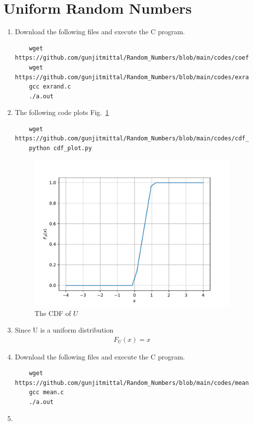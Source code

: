 \documentclass[journal,12pt,twocolumn]{IEEEtran}
\renewcommand\thesection{\arabic{section}}
\begin{document}
\section{Uniform Random Numbers}
\begin{enumerate}[label=\thesection.\arabic*
,ref=\thesection.\theenumi]
    \item \solution{} Download the following files and execute the  C program.
    \begin{lstlisting}
    wget https://github.com/gunjitmittal/Random_Numbers/blob/main/codes/coeffs.h
    wget https://github.com/gunjitmittal/Random_Numbers/blob/main/codes/exrand.c
    gcc exrand.c
    ./a.out
    \end{lstlisting}
    \item \solution{} The following code plots Fig.~\ref{fig:uni_cdf}
    \begin{lstlisting}
    wget https://github.com/gunjitmittal/Random_Numbers/blob/main/codes/cdf_plot.py
    python cdf_plot.py
    \end{lstlisting}
     \begin{figure}[h]
        \centering
        \includegraphics[width=\columnwidth]{../figs/uni_cdf}
        \caption{The CDF of $U$}\label{fig:uni_cdf}
        \end{figure}
    \item \solution{} Since U is  a uniform distribution
    \begin{align}
        F_U(x) = x
    \end{align}
    \item \solution{} Download the following files and execute the  C program.
    \begin{lstlisting}
    wget https://github.com/gunjitmittal/Random_Numbers/blob/main/codes/mean.c
    gcc mean.c
    ./a.out
    \end{lstlisting}
    \item \solution{}
    \end{enumerate}
\end{document}
